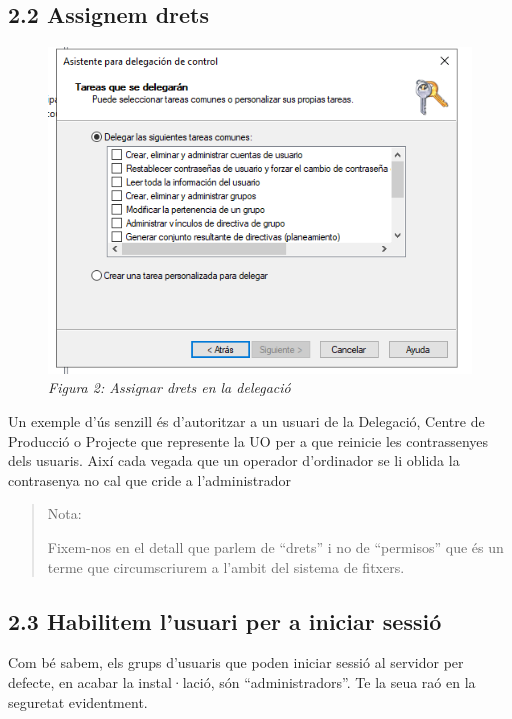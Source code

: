 \documentclass[
  a4paper,
]{article}
\begin{document}
\subsection{2.2 Assignem drets}\label{assignem-drets}

\begin{figure}
\centering
\includegraphics{png/DelegarControl2.png}
\caption{\emph{Figura 2: Assignar drets en la delegació}}
\end{figure}

Un exemple d'ús senzill és d'autoritzar a un usuari de la Delegació,
Centre de Producció o Projecte que represente la UO per a que reinicie
les contrassenyes dels usuaris. Així cada vegada que un operador
d'ordinador se li oblida la contrasenya no cal que cride a
l'administrador

\begin{quote}
Nota:

Fixem-nos en el detall que parlem de ``drets'' i no de ``permisos'' que
és un terme que circumscriurem a l'ambit del sistema de fitxers.
\end{quote}

\subsection{2.3 Habilitem l'usuari per a iniciar
sessió}\label{habilitem-lusuari-per-a-iniciar-sessiuxf3}

Com bé sabem, els grups d'usuaris que poden iniciar sessió al servidor
per defecte, en acabar la instal·lació, són ``administradors''. Te la
seua raó en la seguretat evidentment.
\end{document}
